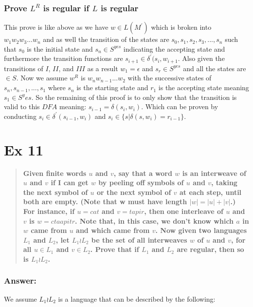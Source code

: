 \documentclass[titlepage]{article}\usepackage[]{graphicx}\usepackage[]{color}
\begin{document}
\subsubsection{Prove $L^R$ is regular if $L$ is regular}
This prove is like above as we have $w \in L(M^{\prime})$ which is broken into $w_1 w_2 w_3 ... w_n$ and as well the transition of the states are $s_0,s_1,s_2,s_3,...,s_n$ such that $s_0$ is the initial state and $s_n \in S^{yes}$ indicating the accepting state and furthermore the transition functions are $s_{i+1} \in \delta^{\prime}(s_i, w_{i+1}$. Also given the transitions of $I$, $II$, and $III$ as a result $w_1 = \epsilon$ and $s_r \in S^{yes}$ and all the states are $\in S$.
Now we assume $w^R$ is $w_n w_{n-1}...w_2$ with the successive states of $s_n,s_{n-1},...,s_1$ where $s_n$ is the starting state and $r_1$ is the accepting state meaning $s_1 \in S^yes$. So the remaining of this proof is to only show that the transition is valid to this $DFA$ meaning: $s_{i-1} = \delta(s_i, w_i)$. Which can be proven by conducting $s_i \in \delta^{\prime}(s_{i-1}, w_i)$ and $s_i \in \{s|\delta(s, w_i) = r_{i-1}\}$.
\vspace{1cm}




\section*{Ex 11}
\begin{quote}
    \textbf{Given finite words $u$ and $v$, say that a word $w$ is an interweave of $u$ and $v$ if I can get $w$ by peeling off symbols of $u$ and $v$, taking the next symbol of $u$ or the next symbol of $v$ at each step, until both are empty. (Note that w must have length $|w| = |u| + |v|$.) For instance, if $u = cat$ and $v = tapir$, then one interleave of $u$ and $v$ is $w = ctaapitr$. Note that, in this case, we don't know which $a$ in $w$ came from $u$ and which came from $v$. Now given two languages $L_{1}$ and $L_{2}$, let $L_{1} \wr L_{2}$ be the set of all interweaves $w$ of $u$ and $v$, for all $u \in L_{1}$ and $v \in L_{2}$. Prove that if $L_{1}$ and $L_{2}$ are regular, then so is $L_{1} \wr L_{2}$.}
  
\end{quote}
\subsubsection*{Answer:}
We assume $L_1 \wr L_2$ is a language that can be described by the following:
\end{document}
